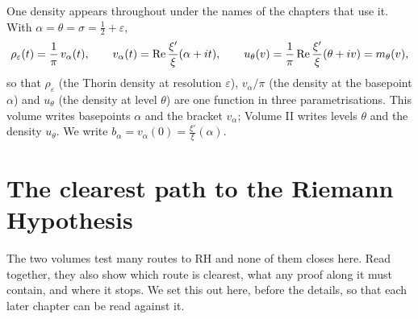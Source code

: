 One density appears throughout under the names of the chapters that use it. With $\alpha=\theta=\sigma=\frac12+\varepsilon$,
\[
\rho_\varepsilon(t)=\frac1\pi\,v_\alpha(t),\qquad v_\alpha(t)=\operatorname{Re}\frac{\xi'}{\xi}(\alpha+it),\qquad u_\theta(v)=\frac1\pi\operatorname{Re}\frac{\xi'}{\xi}(\theta+iv)=m_\theta(v),
\]
so that $\rho_\varepsilon$ (the Thorin density at resolution $\varepsilon$), $v_\alpha/\pi$ (the density at the basepoint $\alpha$) and $u_\theta$ (the density at level $\theta$) are one function in three parametrisations. This volume writes basepoints $\alpha$ and the bracket $v_\alpha$; Volume II writes levels $\theta$ and the density $u_\theta$. We write $b_\alpha=v_\alpha(0)=\frac{\xi'}{\xi}(\alpha)$.

\section{The clearest path to the Riemann Hypothesis}\label{ov1:sec:path}

The two volumes test many routes to RH and none of them closes here. Read together, they also show which route is clearest, what any proof along it must contain, and where it stops. We set this out here, before the details, so that each later chapter can be read against it.


